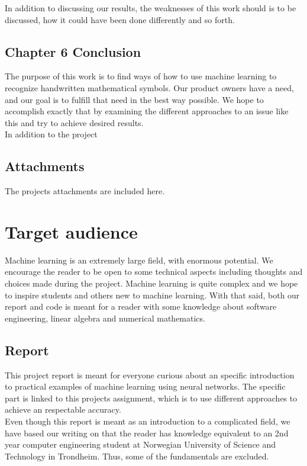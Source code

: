 % 
In addition to discussing our results, the weaknesses of this work should is to be discussed, how it could have been done differently and so forth. 

\subsection{Chapter 6 Conclusion}
The purpose of this work is to find ways of how to use machine learning to recognize handwritten mathematical symbols. Our product owners have a need, and our goal is to fulfill that need in the best way possible. We hope to accomplish exactly that by examining the different approaches to an issue like this and try to achieve desired results.\\
In addition to the project 

\subsection{Attachments}
The projects attachments are included here.

\section{Target audience}
Machine learning is an extremely large field, with enormous potential. We encourage the reader to be open to some technical aspects including thoughts and choices made during the project. Machine learning is quite complex and we hope to inspire students and others new to machine learning. With that said, both our report and code is meant for a reader with some knowledge about software engineering, linear algebra and numerical mathematics.


\subsection{Report} %
This project report is meant for everyone curious about an specific introduction to practical examples of machine learning using neural networks. The specific part is linked to this projects assignment, which is to use different approaches to achieve an respectable accuracy.\\
Even though this report is meant as an introduction to a complicated field, we have based our writing on that the reader has knowledge equivalent to an 2nd year computer engineering student at Norwegian University of Science and Technology in Trondheim. Thus, some of the fundamentals are excluded. %


